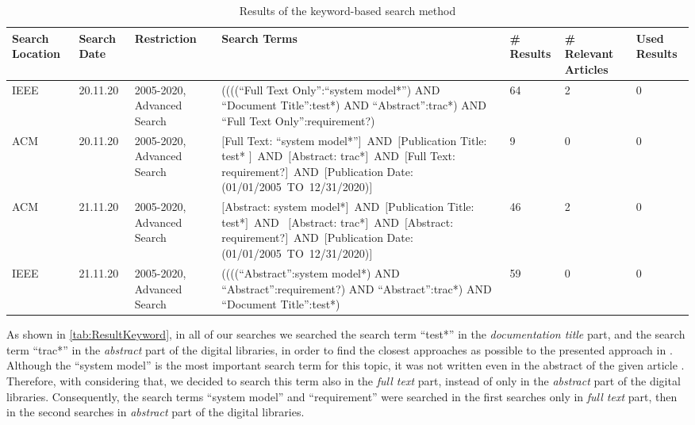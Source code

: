 \begin{table} [H] 
\begin{small}
  \begin{center}
  \begin{scriptsize}
\caption{Results of the keyword-based search method}
\label{tab:ResultKeyword}
\begin{tabular}{   m{1cm} | m{1cm} | m{1.6cm} | m{4.8cm} | m{1cm} | m{1.2cm} | m{0.7cm}  }
\hline
\textbf{Search Location} & \textbf{Search Date} & \textbf{Restriction}  & \textbf{Search Terms}  &  \textbf{\# Results}  & \textbf{\# Relevant Articles}  &  \textbf{Used Results} \\
\hline
IEEE & 20.11.20 & 2005-2020, Advanced Search & ((((\enquote{Full Text Only}:\enquote{system model*}) AND \enquote{Document Title}:test*) AND \enquote{Abstract}:trac*) AND \enquote{Full Text Only}:requirement?) & 64 & 2 & 0\\
\hline
ACM & 20.11.20 & 2005-2020, Advanced Search & $[$Full Text: \enquote{system model*}$]$ AND $[$Publication Title: test* $]$ AND $[$Abstract: trac*$]$ AND $[$Full Text: requirement?$]$ AND $[$Publication Date: (01/01/2005 TO 12/31/2020)$]$ & 9 & 0 & 0\\
\hline
ACM & 21.11.20 & 2005-2020, Advanced Search & $[$Abstract: system model*$]$ AND $[$Publication Title: test*$]$ AND  $[$Abstract: trac*$]$ AND $[$Abstract: requirement?$]$ AND $[$Publication Date: (01/01/2005 TO 12/31/2020)$]$ & 46 & 2 & 0 \\
\hline
IEEE & 21.11.20 & 2005-2020, Advanced Search & ((((\enquote{Abstract}:system model*) AND \enquote{Abstract}:requirement?) AND \enquote{Abstract}:trac*) AND \enquote{Document Title}:test*) & 59 & 0 & 0\\
\hline
\end{tabular}
\end{scriptsize}
 \end{center}
\end{small}
\end{table}

As shown in \autoref{tab:ResultKeyword}, in all of our searches we searched the search term \enquote{test*}  in the \textit{documentation title} part, and the search term \enquote{trac*} in the \textit{abstract} part of the digital libraries, in order to find the closest approaches as possible to the presented approach in \cite{Paper1}. Although the \enquote{system model} is the most important search term for this topic, it was not written even in the abstract of the given article \cite{Paper1}. Therefore, with considering that, we decided to search this term also in the \textit{full text} part, instead of only in the \textit{abstract} part of the digital libraries. Consequently, the search terms \enquote{system model} and \enquote{requirement} were searched in the first searches only in \textit{full text} part, then in the second searches in \textit{abstract} part of the digital libraries. 

